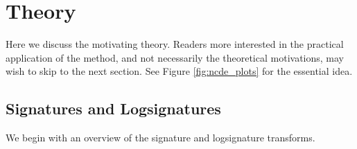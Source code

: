 
\begin{figure*}[!hbtp]
    \begin{subfigure}[t]{.5\linewidth}
        \centering
    \end{subfigure}%
    \begin{subfigure}[t]{.5\linewidth}
        \centering
    \end{subfigure}
    \caption{\textbf{Left:} The original Neural CDE formulation. The path $X_t$ is quickly varying, meaning a lot of integration steps are needed to resolve it. \textbf{Right:} The log-ODE method. The logsignature path is more slowly varying (in a higher dimensional space), and needs fewer integration steps to resolve.}
    \label{fig:ncde_plots}
\end{figure*}

\section{Theory}
Here we discuss the motivating theory. Readers more interested in the practical application of the method, and not necessarily the theoretical motivations, may wish to skip to the next section. See Figure \ref{fig:ncde_plots} for the essential idea.

\subsection{Signatures and Logsignatures}
We begin with an overview of the signature and logsignature transforms.

